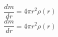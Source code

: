 \begin{equation}
    \frac{dm}{dr} = 4\pi r^2 \rho(r)
\end{equation}
\begin{equation}
    \frac{dm}{dr} = 4\pi r^2 \rho(r)
\end{equation}
